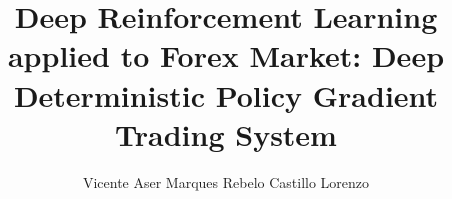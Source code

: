 \documentclass[a4paper]{article}
\begin{document}
\title{Deep Reinforcement Learning applied to Forex Market: Deep Deterministic Policy Gradient Trading System}
\author{Vicente Aser Marques Rebelo Castillo Lorenzo}

\maketitle
\thispagestyle{empty}

\setlength{\abstitleskip}{-\absparindent}


\tableofcontents
\thispagestyle{empty}
\clearpage

\clearpage


\clearpage


\clearpage


\clearpage


\clearpage


\clearpage


\clearpage
{}
\normalem

\ULforem

\end{document}

